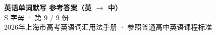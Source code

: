 \documentclass[10pt,a4paper]{article}
\begin{document}
\pagestyle{plain}

\begin{center}
{\LARGE\bfseries 英语单词默写 \quad 参考答案（英 $\to$ 中）}\\[0.22em]
{\large S 字母 · 第 9 / 9 份}\\[0.18em]
{\small 2026年上海市高考英语词汇用法手册 · 参照普通高中英语课程标准}
\end{center}

\vspace{0.2em}
\noindent{\color{rulegray}\rule{\textwidth}{0.8pt}}

\vspace{0.35em}

\vspace{0.25em}
\renewcommand{\arraystretch}{1.32}
\end{document}
